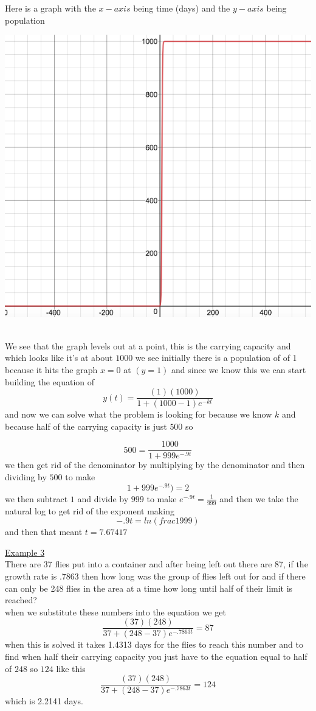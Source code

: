 \documentclass[a4paper,openright, 10pt]{article}
\begin{document}
 Here is a graph with the $x-axis$ being time (days) and the $y-axis$ being population
  \begin{center}
    

\includegraphics[width = 10 cm, height = 5 cm]{house.png}
\end{center}
 \\We see that the graph levels out at a point, this is the carrying capacity and which looks like it's at about $1000$ we see initially there is a population of of 1 because it hits the graph $x=0$ at $(y=1)$ and since we know this we can start building the equation of $$y(t)=\frac{(1)(1000)}{1+(1000-1)e^{-kt}}$$
 and now we can solve what the problem is looking for because we know $k$ and because half of the carrying capacity is just $500$ so
 
 $$500=\frac{1000}{1+999e^{-.9t}}$$
 we then get rid of the denominator by multiplying by the denominator and then dividing by $500$ to make
 $$1+999e^{-.9t})=2$$ we then subtract $1$ and divide by $999$ to make
 $e^{-.9t}=\frac{1}{999}$
 and then we take the natural log to get rid of the exponent making $$-.9t=ln(frac{1}{999})$$
 and then that meant $t=7.67417$
 
 \underline{Example 3}\\ There are 37 flies put into a container and after being left out there are 87, if the growth rate is .7863 then how long was the group of flies left out for and if there can only be 248 flies in the area at a time how long until half of their limit is reached?
 \\when we substitute these numbers into the equation we get $$\frac{(37)(248)}{37+(248-37)e^{-.7863t}}=87$$ 
 when this is solved it takes 1.4313 days for the flies to reach this number and to find when half their carrying capacity you just have to the equation equal to half of $248$ so $124$ like this  
 $$\frac{(37)(248)}{37+(248-37)e^{-.7863t}}=124$$ which is 2.2141 days. 
\end{document}
